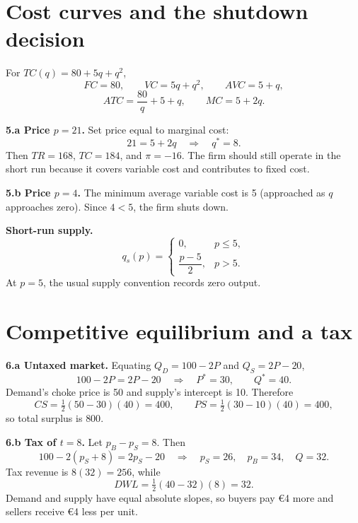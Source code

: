 \documentclass[11pt,a4paper]{article}
\begin{document}
\section{Cost curves and the shutdown decision}

For \(TC(q)=80+5q+q^2\),
\[
FC=80,\qquad VC=5q+q^2,\qquad AVC=5+q,
\]
\[
ATC=\frac{80}{q}+5+q,\qquad MC=5+2q.
\]

\textbf{5.a Price \(p=21\).} Set price equal to marginal cost:
\[
21=5+2q\quad\Longrightarrow\quad\boxed{q^*=8}.
\]
Then \(TR=168\), \(TC=184\), and \(\pi=\boxed{-16}\). The firm should still
operate in the short run because it covers variable cost and contributes to
fixed cost.

\textbf{5.b Price \(p=4\).} The minimum average variable cost is 5 (approached
as \(q\) approaches zero). Since \(4<5\), the firm shuts down.

\begin{solutionbox}
\textbf{Short-run supply.}
\[
q_s(p)=
\begin{cases}
0, & p\leq5,\\[0.3em]
\dfrac{p-5}{2}, & p>5.
\end{cases}
\]
At \(p=5\), the usual supply convention records zero output.
\end{solutionbox}

\section{Competitive equilibrium and a tax}

\textbf{6.a Untaxed market.} Equating \(Q_D=100-2P\) and \(Q_S=2P-20\),
\[
100-2P=2P-20
\quad\Longrightarrow\quad\boxed{P^*=30,\qquad Q^*=40}.
\]
Demand's choke price is 50 and supply's intercept is 10. Therefore
\[
CS=\tfrac12(50-30)(40)=400,\qquad
PS=\tfrac12(30-10)(40)=400,
\]
so total surplus is \(\boxed{800}\).

\textbf{6.b Tax of \(t=8\).} Let \(p_B-p_S=8\). Then
\[
100-2(p_S+8)=2p_S-20
\quad\Longrightarrow\quad
\boxed{p_S=26,\quad p_B=34,\quad Q=32}.
\]
Tax revenue is \(8(32)=\boxed{256}\), while
\[
\boxed{DWL=\tfrac12(40-32)(8)=32}.
\]
Demand and supply have equal absolute slopes, so buyers pay \euro4 more and
sellers receive \euro4 less per unit.

\begin{center}
\end{center}
\end{document}

